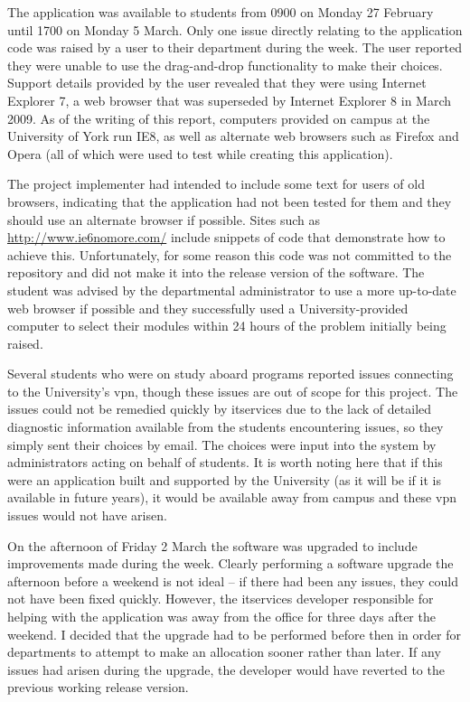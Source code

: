 The application was available to students from 0900 on Monday 27 February
until 1700 on Monday 5 March. Only one issue directly relating to the
application code was raised by a user to their department during the week. The
user reported they were unable to use the drag-and-drop functionality to make
their choices. Support details provided by the user revealed that they were
using Internet Explorer 7, a web browser that was superseded by Internet
Explorer 8 in March 2009. As of the writing of this report, computers provided
on campus at the University of York run IE8, as well as alternate web browsers
such as Firefox and Opera (all of which were used to test while creating this
application).

The project implementer had intended to include some text for users of old
browsers, indicating that the application had not been tested for them and
they should use an alternate browser if possible. Sites such as
\url{http://www.ie6nomore.com/} include snippets of code that demonstrate how
to achieve this. Unfortunately, for some reason this code was not committed to
the repository and did not make it into the release version of the software.
The student was advised by the departmental administrator to use a more
up-to-date web browser if possible and they successfully used a
University-provided computer to select their modules within 24 hours of the
problem initially being raised.

Several students who were on study aboard programs reported issues connecting
to the University's \gls{vpn}, though these issues are out of scope for this
project. The issues could not be remedied quickly by \gls{itservices} due to
the lack of detailed diagnostic information available from the students
encountering issues, so they simply sent their choices by email. The choices
were input into the system by administrators acting on behalf of students. It
is worth noting here that if this were an application built and supported by
the University (as it will be if it is available in future years), it would be
available away from campus and these \gls{vpn} issues would not have arisen.

On the afternoon of Friday 2 March the software was upgraded to include
improvements made during the week. Clearly performing a software upgrade the
afternoon before a weekend is not ideal -- if there had been any issues, they
could not have been fixed quickly. However, the \gls{itservices} developer
responsible for helping with the application was away from the office for
three days after the weekend. I decided that the upgrade had to be performed
before then in order for departments to attempt to make an allocation sooner
rather than later. If any issues had arisen during the upgrade, the developer
would have reverted to the previous working release version.

